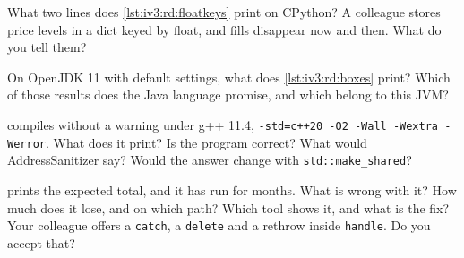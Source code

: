 \begin{question}\label{iq:iv3:reading-debugging-and-software-design:8}
What two lines does \cref{lst:iv3:rd:floatkeys} print on CPython? A colleague stores price levels in a dict keyed by float, and fills disappear now and then. What do you tell them?
\label{lst:iv3:rd:floatkeys}
\end{question}

\begin{question}\label{iq:iv3:reading-debugging-and-software-design:9}
On OpenJDK 11 with default settings, what does \cref{lst:iv3:rd:boxes} print? Which of those results does the Java language promise, and which belong to this JVM?
\label{lst:iv3:rd:boxes}
\end{question}

\begin{question}\label{iq:iv3:reading-debugging-and-software-design:10}
 compiles without a warning under g++ 11.4, \texttt{-std=c++20 -O2 -Wall -Wextra -Werror}. What does it print? Is the program correct? What would AddressSanitizer say? Would the answer change with \texttt{std::make\_shared}?
\label{lst:iv3:rd:dtor}
\end{question}

\begin{question}\label{iq:iv3:reading-debugging-and-software-design:11}
 prints the expected total, and it has run for months. What is wrong with it? How much does it lose, and on which path? Which tool shows it, and what is the fix? Your colleague offers a \texttt{catch}, a \texttt{delete} and a rethrow inside \texttt{handle}. Do you accept that?
\label{lst:iv3:rd:exleak}
\end{question}


